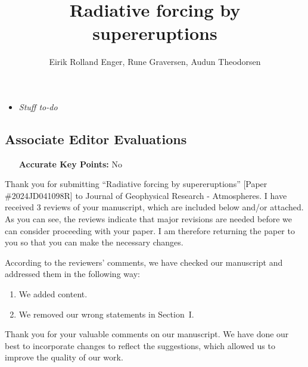 \documentclass{reviewresponse}
\title{Radiative forcing by supereruptions}
\author{Eirik Rolland Enger, Rune Graversen, Audun Theodorsen}
\newenvironment{evaluation}{%
  \begin{tcolorbox}[attach title to upper, title={Evaluations}, after title={.\enskip},
    fonttitle={\bfseries}, coltitle={colorevalfg}, colback={colorevalbg},
    colframe={colorevalframe},]
  }{
  \end{tcolorbox}
}
\begin{document}
  \maketitle

  \begin{itemize}
    \item
    \emph{Stuff to-do}
  \end{itemize}

  \editor %
  \subsection*{Associate Editor Evaluations}
  \begin{evaluation}
    \begin{itemize}[leftmargin=4.5cm,noitemsep]
      \item
      [\textbf{Accurate Key Points:}] No
    \end{itemize}
  \end{evaluation}
  \begin{generalcomment}
    Thank you for submitting ``Radiative forcing by supereruptions'' [Paper
      \#2024JD041098R] to Journal of Geophysical Research - Atmospheres. I have received
    3 reviews of your manuscript, which are included below and/or attached. As you can
    see, the reviews indicate that major revisions are needed before we can consider
    proceeding with your paper. I am therefore returning the paper to you so that you
    can make the necessary changes.
  \end{generalcomment}
  \begin{revresponse}
    According to the reviewers' comments, we have checked our manuscript and addressed
    them in the following way:
    \begin{enumerate}
      \item
      We added content.
      \item
      We removed our wrong statements in Section~I.
    \end{enumerate}
  \end{revresponse}
  \begin{concludingresponse}
    Thank you for your valuable comments on our manuscript. We have done our best to
    incorporate changes to reflect the suggestions, which allowed us to improve the
    quality of our work.
  \end{concludingresponse}
\end{document}
